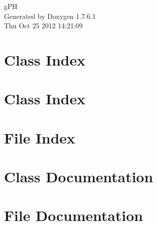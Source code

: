 \documentclass[a4paper]{book}
\begin{document}
\hypersetup{pageanchor=false,citecolor=blue}
\begin{titlepage}
\vspace*{7cm}
\begin{center}
{\Large g\-P\-H }\\
\vspace*{1cm}
{\large \-Generated by Doxygen 1.7.6.1}\\
\vspace*{0.5cm}
{\small Thu Oct 25 2012 14:21:09}\\
\end{center}
\end{titlepage}
\clearemptydoublepage
{}
\tableofcontents
\clearemptydoublepage
{}
\hypersetup{pageanchor=true,citecolor=blue}
\chapter{\-Class \-Index}

\chapter{\-Class \-Index}

\chapter{\-File \-Index}

\chapter{\-Class \-Documentation}

































\chapter{\-File \-Documentation}


















\printindex
\end{document}
